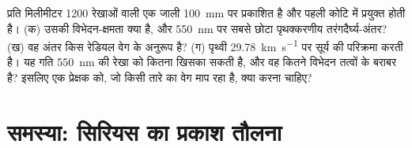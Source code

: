 \begin{exercise}[$\star\star\star$]\label{exo:b1:observing-the-sky:12}
प्रति मिलीमीटर 1200 रेखाओं वाली एक जाली \qty{100}{mm} पर प्रकाशित है और पहली कोटि में प्रयुक्त
होती है। (क) उसकी विभेदन-क्षमता क्या है, और \qty{550}{nm} पर सबसे छोटा पृथक्करणीय तरंगदैर्घ्य-अंतर?
(ख) वह अंतर किस रेडियल वेग के अनुरूप है? (ग) पृथ्वी \qty{29.78}{km.s^{-1}} पर सूर्य की परिक्रमा
करती है। यह गति \qty{550}{nm} की रेखा को कितना खिसका सकती है, और वह कितने विभेदन तत्वों के बराबर
है? इसलिए एक प्रेक्षक को, जो किसी तारे का वेग माप रहा है, क्या करना चाहिए?
\end{exercise}

\section{समस्या: सिरियस का प्रकाश तौलना}

